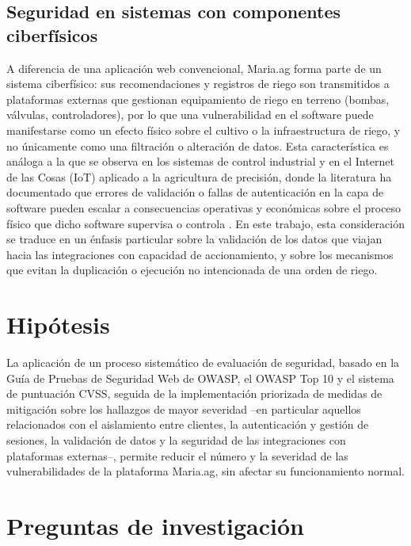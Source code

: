 \documentclass[12pt,letterpaper]{report}
\begin{document}
\section*{Seguridad en sistemas con componentes ciberfísicos}

A diferencia de una aplicación web convencional, Maria.ag forma parte de un
sistema ciberfísico: sus recomendaciones y registros de riego son transmitidos
a plataformas externas que gestionan equipamiento de riego en terreno
(bombas, válvulas, controladores), por lo que una vulnerabilidad en el
software puede manifestarse como un efecto físico sobre el cultivo o la
infraestructura de riego, y no únicamente como una filtración o alteración de
datos. Esta característica es análoga a la que se observa en los sistemas de
control industrial y en el Internet de las Cosas (IoT) aplicado a la
agricultura de precisión, donde la literatura ha documentado que errores de
validación o fallas de autenticación en la capa de software pueden escalar a
consecuencias operativas y económicas sobre el proceso físico que dicho
software supervisa o controla \autocite{fathy2023secure}. En este trabajo,
esta consideración se traduce en un énfasis particular sobre la validación de
los datos que viajan hacia las integraciones con capacidad de accionamiento, y
sobre los mecanismos que evitan la duplicación o ejecución no intencionada de
una orden de riego.

\newpage
\chapter*{Hipótesis}

La aplicación de un proceso sistemático de evaluación de seguridad, basado en la Guía de Pruebas de Seguridad Web de OWASP, el OWASP Top 10 y el sistema de puntuación CVSS, seguida de la implementación priorizada de medidas de mitigación sobre los hallazgos de mayor severidad --en particular aquellos relacionados con el aislamiento entre clientes, la autenticación y gestión de sesiones, la validación de datos y la seguridad de las integraciones con plataformas externas--, permite reducir el número y la severidad de las vulnerabilidades de la plataforma Maria.ag, sin afectar su funcionamiento normal.

\newpage

\chapter*{Preguntas de investigación}
\end{document}
